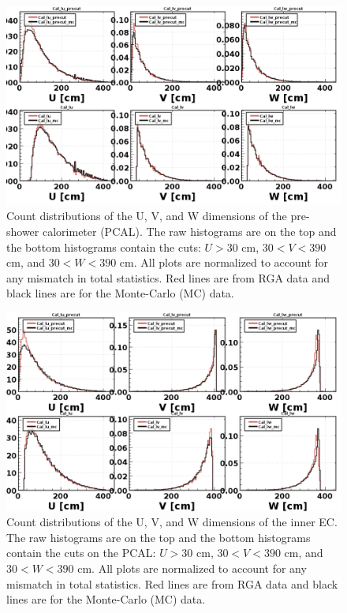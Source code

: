 \begin{figure}[H]
	\centering
	\includegraphics[width=0.9\linewidth]{figures/rga/1d_ecal.png}
	\caption{Count distributions of the U, V, and W dimensions of the pre-shower calorimeter (PCAL). The raw histograms are on the top and the bottom histograms contain the cuts: $U>30$ cm, $30<V<390$ cm, and $30<W<390$ cm. All plots are normalized to account for any mismatch in total statistics. Red lines are from RGA data and black lines are for the Monte-Carlo (MC) data.}
	\label{fig:rga_1decal}
\end{figure}

\begin{figure}[H]
	\centering
	\includegraphics[width=0.9\linewidth]{figures/rga/1d_ecal_ECIN.png}
	\caption{Count distributions of the U, V, and W dimensions of the inner EC. The raw histograms are on the top and the bottom histograms contain the cuts on the PCAL: $U>30$ cm, $30<V<390$ cm, and $30<W<390$ cm. All plots are normalized to account for any mismatch in total statistics. Red lines are from RGA data and black lines are for the Monte-Carlo (MC) data.}
	\label{fig:rga_1decal_ecin}
\end{figure}

